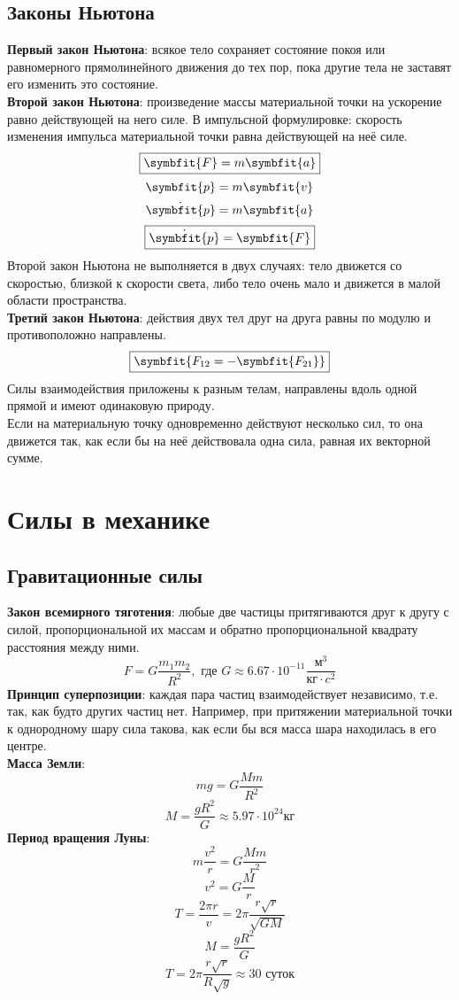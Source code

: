 \documentclass[fleqn,a4paper,12pt,titlepage,finall]{article}
\newcommand\vv[1]{\symbfit{#1}}
\begin{document}
\subsection{Законы Ньютона}
{\bf Первый закон Ньютона}: всякое тело сохраняет состояние покоя или
равномерного прямолинейного движения до тех пор, пока другие тела не заставят
его изменить это состояние. \\
{\bf Второй закон Ньютона}: произведение массы материальной точки на ускорение
равно действующей на него силе. В импульсной формулировке: скорость изменения
импульса материальной точки равна действующей на неё силе.\\
\[\boxed{\vv{F} = m\vv{a}}\]
\[\vv{p} = m\vv{v}\]
\[\dot{\vv{p}} = m\vv{a}\]
\[\boxed{\dot{\vv{p}} = \vv{F}}\]
Второй закон Ньютона не выполняется в двух случаях: тело движется со скоростью,
близкой к скорости света, либо тело очень мало и движется в малой области
пространства. \\
{\bf Третий закон Ньютона}: действия двух тел друг на друга равны по модулю и
противоположно направлены.
\[\boxed{\vv{F_{12} = -\vv{F_{21}}}}\]
Силы взаимодействия приложены к разным телам, направлены вдоль одной прямой и
имеют одинаковую природу.\\
Если на материальную точку одновременно действуют несколько сил, то она движется
так, как если бы на неё действовала одна сила, равная их векторной сумме.

\section{Силы в механике}
\subsection{Гравитационные силы}
{\bf Закон всемирного тяготения}: любые две частицы притягиваются друг к другу с
силой, пропорциональной их массам и обратно пропорциональной квадрату расстояния
между ними.
\[F = G\frac{m_1m_2}{R^2}, \text{ где } G \approx
6.67\cdot10^{-11}\frac{\text{м}^3}{\text{кг}\cdot c^2}\]
{\bf Принцип суперпозиции}: каждая пара частиц взаимодействует независимо, т.е.
так, как будто других частиц нет. Например, при притяжении материальной точки к
однородному шару сила такова, как если бы вся масса шара находилась в его
центре.\\
{\bf Масса Земли}:
\[mg = G\frac{Mm}{R^2}\]
\[M = \frac{gR^2}{G} \approx 5.97 \cdot 10^{24} \text{кг}\]
{\bf Период вращения Луны}:
\[m\frac{v^2}{r} = G\frac{Mm}{r^2}\]
\[v^2=G\frac{M}{r}\]
\[T = \frac{2\pi r}{v} = 2\pi \frac{r\sqrt{r}}{\sqrt{GM}}\]
\[M = \frac{gR^2}{G}\]
\[T = 2\pi \frac{r\sqrt{r}}{R\sqrt{g}} \approx 30 \text{ суток}\]
\end{document}
